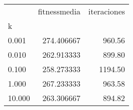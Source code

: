 \begin{tabular}{lrr}
\toprule
{} &  fitnessmedia &  iteraciones \\
k      &               &              \\
\midrule
0.001  &    274.406667 &       960.56 \\
0.010  &    262.913333 &       899.80 \\
0.100  &    258.273333 &      1194.50 \\
1.000  &    267.233333 &       963.58 \\
10.000 &    263.306667 &       894.82 \\
\bottomrule
\end{tabular}
